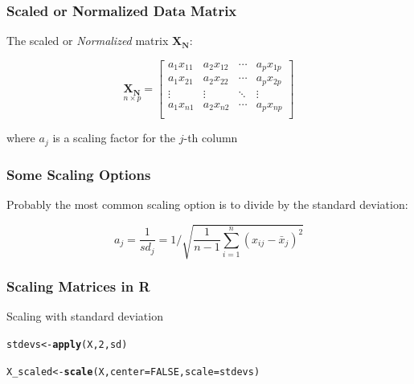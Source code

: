 \documentclass[12pt]{beamer}\usepackage[]{graphicx}\usepackage[]{color}
\makeatletter
\newcommand{\hlnum}[1]{\textcolor[rgb]{0.686,0.059,0.569}{#1}}%
\newcommand{\hlstd}[1]{\textcolor[rgb]{0.345,0.345,0.345}{#1}}%
\newcommand{\hlkwb}[1]{\textcolor[rgb]{0.69,0.353,0.396}{#1}}%
\newcommand{\hlkwc}[1]{\textcolor[rgb]{0.333,0.667,0.333}{#1}}%
\newcommand{\hlkwd}[1]{\textcolor[rgb]{0.737,0.353,0.396}{\textbf{#1}}}%
\newenvironment{kframe}{%
 \def\at@end@of@kframe{}%
 \ifinner\ifhmode%
  \def\at@end@of@kframe{\end{minipage}}%
  \begin{minipage}{\columnwidth}%
 \fi\fi%
 \def\FrameCommand##1{\hskip\@totalleftmargin \hskip-\fboxsep
 \colorbox{shadecolor}{##1}\hskip-\fboxsep
     \hskip-\linewidth \hskip-\@totalleftmargin \hskip\columnwidth}%
 \MakeFramed {\advance\hsize-\width
   \@totalleftmargin\z@ \linewidth\hsize
   \@setminipage}}%
 {\par\unskip\endMakeFramed%
 \at@end@of@kframe}
\newenvironment{knitrout}{}{} %
\makeatother
\begin{document}

\begin{frame}
\begin{center}
\Huge{}
\end{center}
\end{frame}


\begin{frame}
\frametitle{Scaled or Normalized Data Matrix}

The scaled or \textit{Normalized} matrix $\mathbf{X_N}$:

\[ \underset{n \times p}{\mathbf{X_N}} = 
\left[\begin{array}{cccc}
a_1 x_{11} & a_2 x_{12} & \cdots & a_p x_{1p} \\
a_1 x_{21} & a_2 x_{22} & \cdots & a_p x_{2p} \\
\vdots & \vdots & \ddots & \vdots \\
a_1 x_{n1} & a_2 x_{n2} & \cdots & a_p x_{np} \\
\end{array}\right]
\]

where $a_j$ is a scaling factor for the $j$-th column

\end{frame}


\begin{frame}
\frametitle{Some Scaling Options}

Probably the most common scaling option is to divide by the standard deviation:

$$
a_j = \frac{1}{sd_j} = 1 / \sqrt{\frac{1}{n-1} \sum_{i=1}^{n} (x_{ij} - \bar{x}_j)^2}
$$

\end{frame}


\begin{frame}[fragile]
\frametitle{Scaling Matrices in R}

Scaling with standard deviation

\begin{knitrout}\footnotesize
{}\color{fgcolor}\begin{kframe}
\begin{alltt}
\hlstd{stdevs} \hlkwb{<-} \hlkwd{apply}\hlstd{(X,} \hlnum{2}\hlstd{, sd)}

\hlstd{X_scaled} \hlkwb{<-} \hlkwd{scale}\hlstd{(X,} \hlkwc{center} \hlstd{=} \hlnum{FALSE}\hlstd{,} \hlkwc{scale} \hlstd{= stdevs)}
\end{alltt}
\end{kframe}
\end{knitrout}

\end{frame}
\end{document}
